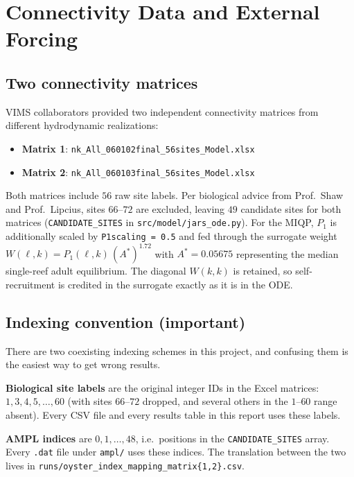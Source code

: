 \documentclass[11pt]{article}
\begin{document}
\section{Connectivity Data and External Forcing}

\subsection{Two connectivity matrices}

VIMS collaborators provided two independent connectivity matrices from different hydrodynamic realizations:

\begin{itemize}[leftmargin=1.4em, itemsep=0.1em]
  \item \textbf{Matrix 1}: \texttt{nk\_All\_060102final\_56sites\_Model.xlsx}
  \item \textbf{Matrix 2}: \texttt{nk\_All\_060103final\_56sites\_Model.xlsx}
\end{itemize}

Both matrices include $56$ raw site labels. Per biological advice from Prof.\ Shaw and Prof.\ Lipcius, sites $66$--$72$ are excluded, leaving $49$ candidate sites for both matrices (\texttt{CANDIDATE\_SITES} in \texttt{src/model/jars\_ode.py}). For the MIQP, $P_1$ is additionally scaled by \texttt{P1scaling = 0.5} and fed through the surrogate weight $W(\ell, k) = P_1(\ell, k)\,(A^*)^{1.72}$ with $A^* = 0.05675$ representing the median single-reef adult equilibrium. The diagonal $W(k,k)$ is retained, so self-recruitment is credited in the surrogate exactly as it is in the ODE.

\subsection{Indexing convention (important)}

There are two coexisting indexing schemes in this project, and confusing them is the easiest way to get wrong results.

\begin{notebox}
\textbf{Biological site labels} are the original integer IDs in the Excel matrices: $1, 3, 4, 5, \ldots, 60$ (with sites $66$--$72$ dropped, and several others in the $1$--$60$ range absent). Every CSV file and every results table in this report uses these labels.

\textbf{AMPL indices} are $0, 1, \ldots, 48$, i.e.\ positions in the \texttt{CANDIDATE\_SITES} array. Every \texttt{.dat} file under \texttt{ampl/} uses these indices. The translation between the two lives in \texttt{runs/oyster\_index\_mapping\_matrix\{1,2\}.csv}.
\end{notebox}
\end{document}

